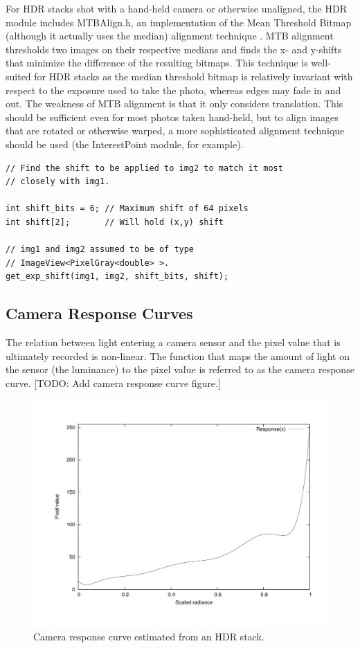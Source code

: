 For HDR stacks shot with a hand-held camera or otherwise unaligned,
the HDR module includes MTBAlign.h, an implementation of the Mean
Threshold Bitmap (although it actually uses the median) alignment
technique \cite{hdrbook}. MTB alignment thresholds two images on their
respective medians and finds the x- and y-shifts that minimize the
difference of the resulting bitmaps. This technique is well-suited for
HDR stacks as the median threshold bitmap is relatively invariant with
respect to the exposure used to take the photo, whereas edges may fade
in and out. The weakness of MTB alignment is that it only considers
translation. This should be sufficient even for most photos taken
hand-held, but to align images that are rotated or otherwise warped, a
more sophisticated alignment technique should be used (the
InterestPoint module, for example).

\begin{verbatim}
// Find the shift to be applied to img2 to match it most
// closely with img1.

int shift_bits = 6; // Maximum shift of 64 pixels
int shift[2];       // Will hold (x,y) shift

// img1 and img2 assumed to be of type
// ImageView<PixelGray<double> >.
get_exp_shift(img1, img2, shift_bits, shift);
\end{verbatim}

\subsection{Camera Response Curves}
The relation between light entering a camera sensor and the pixel
value that is ultimately recorded is non-linear.  The function that
maps the amount of light on the sensor (the luminance) to the pixel
value is referred to as the camera response curve.  [TODO: Add camera
  response curve figure.]  

\begin{figure}[tbp]
\begin{center}
  \includegraphics[width=5in]{images/hdr_response.pdf}
 \end{center}
  \label{fig:response}
  \caption{Camera response curve estimated from an HDR stack.}
\end{figure}

